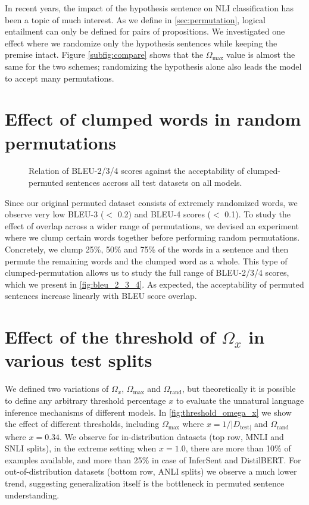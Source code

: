 \documentclass[11pt,a4paper]{article}
\begin{document}
In recent years, the impact of the hypothesis sentence \citep{gururangan-etal-2018-annotation, tsuchiya-2018-performance, poliak-etal-2018-hypothesis} on NLI classification has been a topic of much interest. As we define in \autoref{sec:permutation}, logical entailment can only be defined for pairs of propositions. We investigated one effect where we randomize only the hypothesis sentences while keeping the premise intact. Figure \ref{subfig:compare} shows that the $\Omega_{\text{max}}$ value is almost the same for the two schemes; randomizing the hypothesis alone also leads the model to accept many permutations.

\section{Effect of clumped words in random permutations}
\label{app_sec:bleu_all}

\begin{figure}
    \centering
    \caption{Relation of BLEU-2/3/4 scores against the acceptability of clumped-permuted sentences accross all test datasets on all models. }
    \label{fig:bleu_2_3_4}
\end{figure}

Since our original permuted dataset consists of extremely randomized words, we observe very low BLEU-3 ($<$ 0.2) and BLEU-4 scores ($<$ 0.1). To study the effect of overlap across a wider range of permutations, we devised an experiment where we clump certain words together before performing random permutations. Concretely, we clump 25\%, 50\% and 75\% of the words in a sentence and then permute the remaining words and the clumped word as a whole. This type of clumped-permutation allows us to study the full range of BLEU-2/3/4 scores, which we present in \autoref{fig:bleu_2_3_4}. As expected, the acceptability of permuted sentences increase linearly with BLEU score overlap. 

\section{Effect of the threshold of $\Omega_x$ in various test splits}
\label{app_sec:threshold}

We defined two variations of $\Omega_x$, $\Omega_{\text{max}}$ and $\Omega_{\text{rand}}$, but theoretically it is possible to define any arbitrary threshold percentage $x$ to evaluate the unnatural language inference mechanisms of different models. In \autoref{fig:threshold_omega_x} we show the effect of different thresholds, including $\Omega_{\text{max}}$ where $x = 1/|D_{\text{test}|}$ and $\Omega_{\text{rand}}$ where $x = 0.34$. We observe for in-distribution datasets (top row, MNLI and SNLI splits), in the extreme setting when $x=1.0$, there are more than 10\% of examples available, and more than 25\% in case of InferSent and DistilBERT. For out-of-distribution datasets (bottom row, ANLI splits) we observe a much lower trend, suggesting generalization itself is the bottleneck in permuted sentence understanding.
\end{document}
